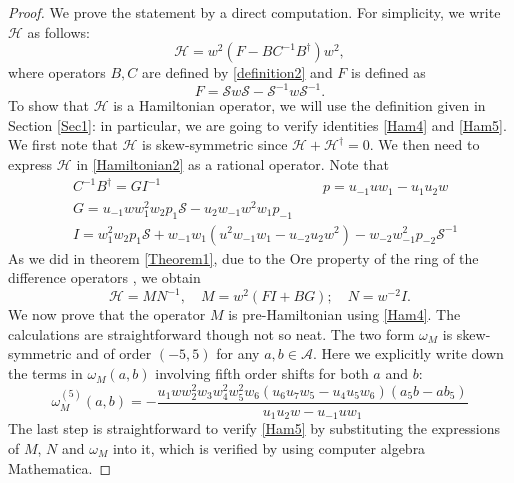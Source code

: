 \documentclass{article}
\numberwithin{equation}{section}
\newcommand\cH{{\mathcal H}}
\newcommand\cS{{\mathcal S}}
\newcommand\cA{{\mathcal A}}
\begin{document}
	\begin{proof}
		We prove the statement by a direct computation. For simplicity, we write $\cH$ as follows:
		\begin{equation}
			\cH = w^2 \left( F - B C^{-1} B^\dagger \right)w^2,
			\label{HamilDeco}
		\end{equation}
where operators $B, C$ are defined by \eqref{definition2} and  $F$  is defined as
\begin{equation}
   F = \mathcal{S} w \mathcal{S} - \mathcal{S}^{-1}w 
\mathcal{S}^{-1}.
\label{Definitions2}
\end{equation}
To show that $\cH$ is a Hamiltonian operator, we
will use the definition given in Section \ref{Sec1}: in particular, we are going to verify identities
\eqref{Ham4} and \eqref{Ham5}. We first note that $\cH$ is skew-symmetric since
$\cH + \cH^\dagger = 0$.
We then need to express $\cH$ in \eqref{Hamiltonian2} as a rational operator. Note that
\begin{subequations}
 \begin{align*}
  & C^{-1} B^\dagger = G I^{-1}\qquad\qquad\qquad\qquad\quad\qquad\;\; p = u_{-1} u w_1 - u_1 u_2 w\\
  & G = u_{-1} w w_1^2 w_2 p_1 \cS -u_2 w_{-1} w^2 w_1  p_{-1} \\
  & I =  w_1^2 w_2 p_1  \cS+ w_{-1} w_1 \left(u^2 w_{-1} w_1-u_{-2} u_2 w^2\right) - w_{-2} w_{-1}^2 p_{-2} \cS^{-1}
 \end{align*}
\end{subequations}
 As we did in theorem \ref{Theorem1}, due to the Ore property of the ring of the difference operators \cite{4}, we obtain
\begin{equation*}
  \cH =  M N^{-1}, \quad M = w^2\left(F I + B G\right); \quad N=w^{-2} I.
\end{equation*}
We now prove that the operator $M$ is pre-Hamiltonian using
\eqref{Ham4}. The calculations are straightforward though not so neat. The two form
 $\omega_M$ is skew-symmetric and of order $(-5,5)$ for any $a, b\in \cA$. Here we explicitly write down the terms in $\omega_M(a,b)$
 involving fifth order shifts for both $a$ and $b$:
\begin{equation*}
    \omega_M^{(5)}(a,b)=-\frac{u_1 w w_2^2 w_3 w_4^2 w_5^2 
w_6 \left(u_6 u_7 w_5-u_4 u_5 w_6\right)\left(a_5 b-a b_5\right) }{u_1 u_2 
w-u_{-1} u w_1}
\end{equation*}
The last step is straightforward to verify \eqref{Ham5} by substituting
 the expressions of $M$, $N$ and $\omega_M$ into it, which is verified by using
computer algebra Mathematica.
\end{proof}
\end{document}

